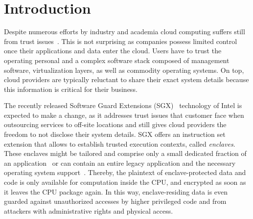 \documentclass[11pt]{article}
\theoremstyle{plain-boldhead}
\theoremstyle{definition-boldhead}
\begin{document}
\acresetall

\section{Introduction}\label{sec:intro}

Despite numerous efforts by industry and academia cloud computing suffers still from trust issues~\cite{Jayaram2014,Pearson2010}.
This is not surprising as companies possess limited control once their applications and data enter the cloud. 
Users have to trust the operating personal and a complex software stack composed of management software, virtualization layers, as well as commodity operating systems. 
On top, cloud providers are typically reluctant to share their exact system details because this information is critical for their business. 

The recently released Software Guard Extensions (SGX)~\cite{mckeen2013} technology of Intel is expected to make a change, as it addresses trust issues that customer face when outsourcing services to off-site locations and still gives cloud providers the freedom to not disclose their system details.
SGX offers an instruction set extension that allows to establish trusted execution contexts, called \emph{enclaves}.
These enclaves might be tailored and comprise only a small dedicated fraction of an application~\cite{hoekstra2013usinginnovative,mw16seckeeper} or can contain an entire legacy application and the
necessary operating system support~\cite{baumann2014,scone-osdi16}.
Thereby, the plaintext of enclave-protected data and code is only available for computation inside the CPU, and encrypted as soon as it leaves the CPU package again. 
In this way, enclave-residing data is even guarded against unauthorized accesses by higher privileged code and from attackers with administrative rights and physical access.
\end{document}
